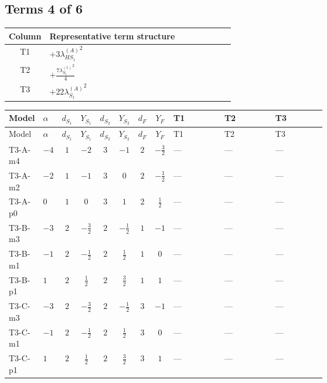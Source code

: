 \documentclass[8pt]{article}
\begin{document}
\begin{landscape}
\subsection*{Terms 4 of 6}
\begin{center}
\begin{tabular}{@{}c >{\raggedright\arraybackslash}p{0.82\linewidth}@{}}
\toprule
Column & Representative term structure \\
\midrule
T1 & \(\displaystyle +3 {\lambda_{HS_1}^{(A)}}^2\) \\
\midrule
T2 & \(\displaystyle +\frac{7 {\lambda_{S_1}^{(1)}}^2}{4}\) \\
\midrule
T3 & \(\displaystyle +22 {\lambda_{S_1}^{(A)}}^2\) \\
\midrule
\bottomrule
\end{tabular}
\end{center}
\smallskip
\tiny
\begin{longtable}{@{}llcccccc >{\raggedright\arraybackslash}p{0.21\linewidth} >{\raggedright\arraybackslash}p{0.21\linewidth} >{\raggedright\arraybackslash}p{0.21\linewidth}@{}}
\toprule
Model & $\alpha$ & $d_{S_1}$ & $Y_{S_1}$ & $d_{S_2}$ & $Y_{S_2}$ & $d_F$ & $Y_F$ & T1 & T2 & T3 \\
\midrule
\endfirsthead
\toprule
Model & $\alpha$ & $d_{S_1}$ & $Y_{S_1}$ & $d_{S_2}$ & $Y_{S_2}$ & $d_F$ & $Y_F$ & T1 & T2 & T3 \\
\midrule
\endhead
T3-A-m4 & $-4$ & $1$ & $-2$ & $3$ & $-1$ & $2$ & $-\frac{3}{2}$ & --- & --- & --- \\
\midrule
T3-A-m2 & $-2$ & $1$ & $-1$ & $3$ & $0$ & $2$ & $-\frac{1}{2}$ & --- & --- & --- \\
\midrule
T3-A-p0 & $0$ & $1$ & $0$ & $3$ & $1$ & $2$ & $\frac{1}{2}$ & --- & --- & --- \\
\midrule
T3-B-m3 & $-3$ & $2$ & $-\frac{3}{2}$ & $2$ & $-\frac{1}{2}$ & $1$ & $-1$ & --- & --- & --- \\
\midrule
T3-B-m1 & $-1$ & $2$ & $-\frac{1}{2}$ & $2$ & $\frac{1}{2}$ & $1$ & $0$ & --- & --- & --- \\
\midrule
T3-B-p1 & $1$ & $2$ & $\frac{1}{2}$ & $2$ & $\frac{3}{2}$ & $1$ & $1$ & --- & --- & --- \\
\midrule
T3-C-m3 & $-3$ & $2$ & $-\frac{3}{2}$ & $2$ & $-\frac{1}{2}$ & $3$ & $-1$ & --- & --- & --- \\
\midrule
T3-C-m1 & $-1$ & $2$ & $-\frac{1}{2}$ & $2$ & $\frac{1}{2}$ & $3$ & $0$ & --- & --- & --- \\
\midrule
T3-C-p1 & $1$ & $2$ & $\frac{1}{2}$ & $2$ & $\frac{3}{2}$ & $3$ & $1$ & --- & --- & --- \\

\end{longtable}
\end{landscape}
\end{document}
